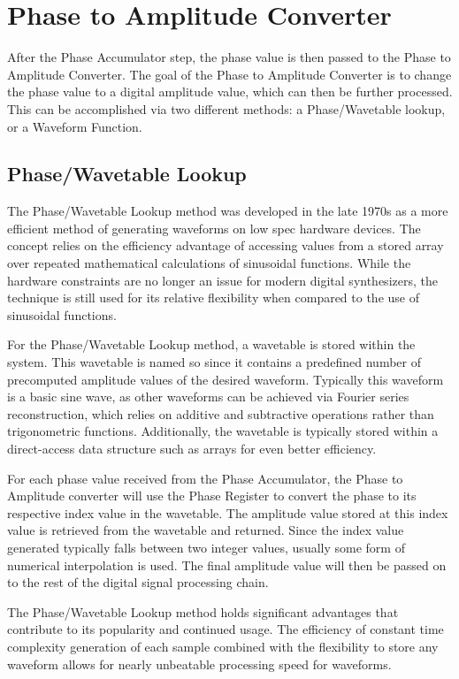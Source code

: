 \documentclass[a4paper,12pt]{report}
\begin{document}
\section{Phase to Amplitude Converter}
After the Phase Accumulator step, the phase value is then passed to the Phase to Amplitude Converter. The goal of the Phase to Amplitude Converter is to change the phase value to a digital amplitude value, which can then be further processed. This can be accomplished via two different methods: a Phase/Wavetable lookup, or a Waveform Function.

\subsection{Phase/Wavetable Lookup}
The Phase/Wavetable Lookup method was developed in the late 1970s as a more efficient method of generating waveforms on low spec hardware devices. The concept relies on the efficiency advantage of accessing values from a stored array over repeated mathematical calculations of sinusoidal functions. While the hardware constraints are no longer an issue for modern digital synthesizers, the technique is still used for its relative flexibility when compared to the use of sinusoidal functions.

For the Phase/Wavetable Lookup method, a wavetable is stored within the system. This wavetable is named so since it contains a predefined number of precomputed amplitude values of the desired waveform. Typically this waveform is a basic sine wave, as other waveforms can be achieved via Fourier series reconstruction, which relies on additive and subtractive operations rather than trigonometric functions. Additionally, the wavetable is typically stored within a direct-access data structure such as arrays for even better efficiency.


For each phase value received from the Phase Accumulator, the Phase to Amplitude converter will use the Phase Register to convert the phase to its respective index value in the wavetable. The amplitude value stored at this index value is retrieved from the wavetable and returned. Since the index value generated typically falls between two integer values, usually some form of numerical interpolation is used. The final amplitude value will then be passed on to the rest of the digital signal processing chain.

The Phase/Wavetable Lookup method holds significant advantages that contribute to its popularity and continued usage. The efficiency of constant time complexity generation of each sample combined with the flexibility to store any waveform allows for nearly unbeatable processing speed for waveforms.
\end{document}
